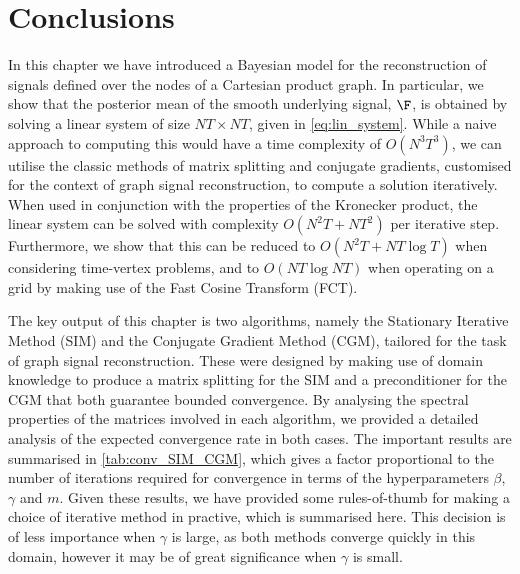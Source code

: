 







\section{Conclusions}

In this chapter we have introduced a Bayesian model for the reconstruction of signals defined over the nodes of a Cartesian product graph. In particular, we show that the posterior mean of the smooth underlying signal, $\F$, is obtained by solving a linear system of size $NT \times NT$, given in \cref{eq:lin_system}. While a naive approach to computing this would have a time complexity of $O(N^3T^3)$, we can utilise the classic methods of matrix splitting and conjugate gradients, customised for the context of graph signal reconstruction, to compute a solution iteratively. When used in conjunction with the properties of the Kronecker product, the linear system can be solved with complexity $O(N^2T + NT^2)$ per iterative step. Furthermore, we show that this can be reduced to $O(N^2T + NT \log T)$ when considering time-vertex problems, and to $O(NT \log NT)$ when operating on a grid by making use of the Fast Cosine Transform (FCT). 

The key output of this chapter is two algorithms, namely the Stationary Iterative Method (SIM) and the Conjugate Gradient Method (CGM), tailored for the task of graph signal reconstruction. These were designed by making use of domain knowledge to produce a matrix splitting for the SIM and a preconditioner for the CGM that both guarantee bounded convergence. By analysing the spectral properties of the matrices involved in each algorithm, we provided a detailed analysis of the expected convergence rate in both cases. The important results are summarised in \cref{tab:conv_SIM_CGM}, which gives a factor proportional to the number of iterations required for convergence in terms of the hyperparameters $\beta$, $\gamma$ and $m$. Given these results, we have provided some rules-of-thumb for making a choice of iterative method in practive, which is summarised here. This decision is of less importance when $\gamma$ is large, as both methods converge quickly in this domain, however it may be of great significance when $\gamma$ is small. 

